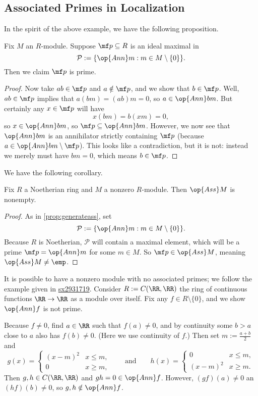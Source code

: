 \subsection{Associated Primes in Localization}
In the spirit of the above example, we have the following proposition.
\begin{proposition} \label{prop:generateass}
	Fix $M$ an $R$-module. Suppose $\mf p\subseteq R$ is an ideal maximal in
	\[\mathcal P:=\{\op{Ann}m:m\in M\setminus\{0\}\}.\]
	Then we claim $\mf p$ is prime.
\end{proposition}
\begin{proof}
	Now take $ab\in\mf p$ and $a\notin\mf p$, and we show that $b\in\mf p$. Well, $ab\in\mf p$ implies that $a(bm)=(ab)m=0$, so $a\in\op{Ann}bm$. But certainly any $x\in\mf p$ will have
	\[x(bm)=b(xm)=0,\]
	so $x\in\op{Ann}bm$, so $\mf p\subseteq\op{Ann}bm$. However, we now see that $\op{Ann}bm$ is an annihilator strictly containing $\mf p$ (because $a\in\op{Ann}bm\setminus\mf p$). This looks like a contradiction, but it is not: instead we merely must have $bm=0$, which means $b\in\mf p$.
\end{proof}
We have the following corollary.
\begin{corollary} \label{cor:hasass}
	Fix $R$ a Noetherian ring and $M$ a nonzero $R$-module. Then $\op{Ass}M$ is nonempty.
\end{corollary}
\begin{proof}
	As in \autoref{prop:generateass}, set
	\[\mathcal P:=\{\op{Ann}m:m\in M\setminus\{0\}\}.\]
	Because $R$ is Noetherian, $\mathcal P$ will contain a maximal element, which will be a prime $\mf p=\op{Ann}m$ for some $m\in M$. So $\mf p\in\op{Ass}M$, meaning $\op{Ass}M\ne\emp$.
\end{proof}
\begin{remark}[Nir]
	It is possible to have a nonzero module with no associated primes; we follow the example given in \href{https://math.stackexchange.com/a/3365952/869257}{sx2931719}. Consider $R:=C(\RR,\RR)$ the ring of continuous functions $\RR\to\RR$ as a module over itself. Fix any $f\in R\setminus\{0\}$, and we show $\op{Ann}f$ is not prime.

	Because $f\ne0$, find $a\in\RR$ such that $f(a)\ne0$, and by continuity some $b>a$ close to $a$ also has $f(b)\ne0$. (Here we use continuity of $f$.) Then set $m:=\frac{a+b}2$ and
	\[g(x)=\begin{cases}
		(x-m)^2 & x \le m, \\
		0 & x \ge m,
	\end{cases}\qquad\text{and}\qquad h(x)=\begin{cases}
		0 & x \le m, \\
		(x-m)^2 & x \ge m.
	\end{cases}\]
	Then $g,h\in C(\RR,\RR)$ and $gh=0\in\op{Ann}f$. However, $(gf)(a)\ne0$ an $(hf)(b)\ne0$, so $g,h\notin\op{Ann}f$.
\end{remark}

